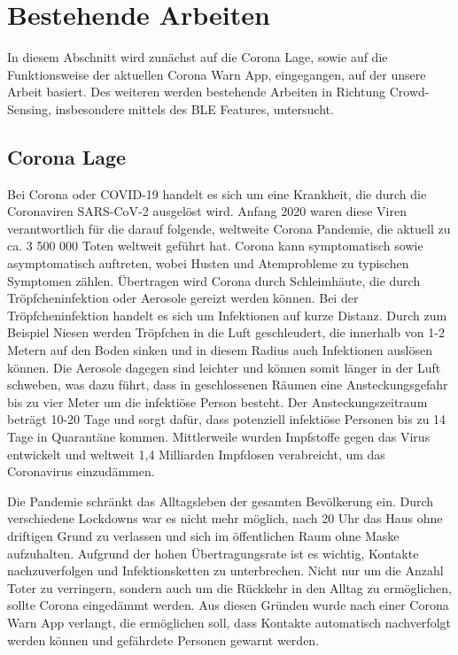 \documentclass[conference,compsoc]{IEEEtran}
\begin{document}
\section{Bestehende Arbeiten} \label{rel_work}

In diesem Abschnitt wird zunächst auf die Corona Lage, sowie auf die Funktionsweise der aktuellen Corona Warn App, eingegangen, auf der unsere Arbeit basiert. 
Des weiteren werden  bestehende Arbeiten in Richtung Crowd-Sensing, insbesondere mittels des BLE Features, untersucht. 
\subsection{Corona Lage}
Bei Corona oder COVID-19 handelt es sich um eine Krankheit, die durch die Coronaviren SARS-CoV-2 ausgelöst wird. 
Anfang 2020 waren diese Viren verantwortlich für die darauf folgende, weltweite Corona Pandemie, die aktuell zu ca. 3 500 000 Toten weltweit geführt hat. 
Corona kann symptomatisch sowie asymptomatisch auftreten, wobei Husten und Atemprobleme zu typischen Symptomen zählen.
Übertragen wird Corona durch Schleimhäute, die durch Tröpfcheninfektion oder Aerosole gereizt werden können.
Bei der Tröpfcheninfektion handelt es sich um Infektionen auf kurze Distanz. Durch zum Beispiel Niesen werden Tröpfchen in die Luft geschleudert, 
die innerhalb von 1-2 Metern auf den Boden sinken und in diesem Radius auch Infektionen auslösen können. 
Die Aerosole dagegen sind leichter und können somit länger in der Luft schweben, 
was dazu führt, dass in geschlossenen Räumen eine Ansteckungsgefahr bis zu vier Meter um die infektiöse Person besteht. 
Der Ansteckungszeitraum beträgt 10-20 Tage und sorgt dafür, dass potenziell infektiöse Personen bis zu 14 Tage in Quarantäne kommen.
Mittlerweile wurden Impfstoffe gegen das Virus entwickelt und weltweit 1,4 Milliarden Impfdosen verabreicht, um das Coronavirus einzudämmen.

Die Pandemie schränkt das Alltagsleben der gesamten Bevölkerung ein. 
Durch verschiedene Lockdowns war es nicht mehr möglich, nach 20 Uhr das Haus ohne driftigen Grund zu verlassen und sich im öffentlichen Raum ohne Maske aufzuhalten. 
Aufgrund der hohen Übertragungsrate ist es wichtig, Kontakte nachzuverfolgen und Infektionsketten zu unterbrechen.
Nicht nur um die Anzahl Toter zu verringern, sondern auch um die Rückkehr in den Alltag zu ermöglichen, sollte Corona eingedämmt werden.
Aus diesen Gründen wurde nach einer Corona Warn App verlangt, die ermöglichen soll, dass Kontakte automatisch nachverfolgt werden können und gefährdete Personen gewarnt werden.
\end{document}
